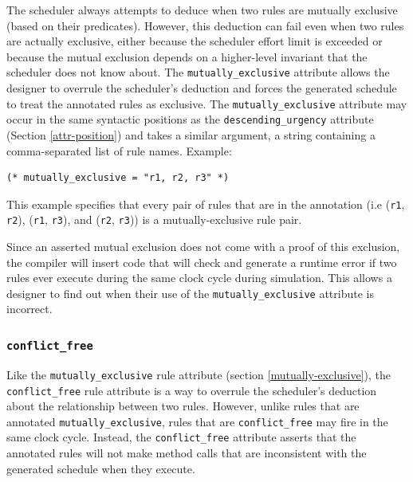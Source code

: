 \documentclass[twoside,letterpaper]{article}
\newcommand{\te}[1]{\texttt{#1}}
\begin{document}
The scheduler always attempts to deduce when two rules are mutually 
exclusive (based on their predicates). However, this deduction can 
fail even when two rules are actually exclusive, either because the 
scheduler effort limit is exceeded or because the mutual exclusion 
depends on a higher-level invariant that the scheduler does not know 
about. The \te{mutually\_exclusive} attribute allows the designer to 
overrule the scheduler's deduction and forces the generated schedule
to treat the annotated rules as exclusive. The \te{mutually\_exclusive}
attribute may occur in the same syntactic
positions as the \te{descending\_urgency} attribute (Section
\ref{attr-position}) and takes a similar
argument, a string containing a comma-separated list of rule names. Example:
\begin{verbatim}
(* mutually_exclusive = "r1, r2, r3" *)
\end{verbatim}
This example specifies that every pair of rules that are in the annotation
(i.e (\te{r1}, \te{r2}), (\te{r1}, \te{r3}), and (\te{r2}, \te{r3})) is a
mutually-exclusive rule pair. 

Since an asserted mutual exclusion does not come with a proof of this 
exclusion, the compiler will insert code that will check and generate
a runtime error if two
rules ever execute during the same clock cycle during simulation.
This allows a designer to find out when their use of the 
\te{mutually\_exclusive} attribute is incorrect.


\subsubsection { \te{conflict\_free} }

\label{conflict-free-annotation}

\index{conflict\_free@\te{conflict\_free} (attribute)}

Like the \te{mutually\_exclusive} rule attribute (section \ref{mutually-exclusive}),
the \te{conflict\_free} rule attribute is a way to overrule the scheduler's 
deduction about the relationship between two rules. However, unlike rules that are annotated \te{mutually\_exclusive}, rules that are \te{conflict\_free} 
may fire in the same clock cycle. Instead, the \te{conflict\_free} attribute 
asserts that the annotated rules will not make method calls that are 
inconsistent with the generated schedule when they execute. 
\end{document}

